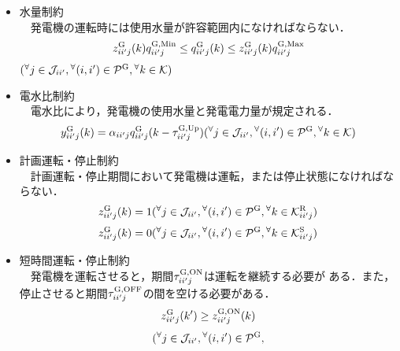 \begin{itemize}
\begin{equation}
		\end{equation}			
%	
	\item 水量制約 \\
	　発電機の運転時には使用水量が許容範囲内になければならない．
%
		\begin{equation}
			z^{\rm G}_{ii'j} (k) q_{ii'j}^{\mathrm{G,Min}} \leq q^{\rm G}_{ii'j} (k) \leq %
			z^{\rm G}_{ii'j} (k) q_{ii'j}^{\mathrm{G,Max}} 
		\end{equation}
%	
		\hspace{7.5cm}
		$ ( {}^{\forall} j \in \mathcal{J}_{ii'} , {}^\forall(i,i') \in \mathcal{P}^{\rm G} , %
		{}^{\forall} k \in \mathcal{K}) $
%
	\item 電水比制約 \\
	　電水比により，発電機の使用水量と発電電力量が規定される．
%
		\begin{equation}
			y^{\rm G}_{ii'j}(k) = \alpha_{ii'j} q^{\rm G}_{ii'j}(k - \tau^{\rm G,Up}_{ii'j})%
			\hfill ( {}^{\forall} j \in \mathcal{J}_{ii'} , {}^\forall(i,i') \in \mathcal{P}^{\rm G} , %
			{}^{\forall} k \in \mathcal{K}) 
		\end{equation}	
%		
	\item 計画運転・停止制約 \\
	　計画運転・停止期間において発電機は運転，または停止状態になければならない．
%
		\begin{equation}
			z^{\rm G}_{ii'j} (k) = 1
			\hfill ( {}^{\forall} j \in \mathcal{J}_{ii'} , {}^\forall(i,i') \in \mathcal{P}^{\rm G} , %
			{}^{\forall} k \in \mathcal{K}^{\rm R}_{ii'j})
		\end{equation}	
%		
		\begin{equation}
			z^{\rm G}_{ii'j} (k) = 0
			\hfill ( {}^{\forall} j \in \mathcal{J}_{ii'} , {}^\forall(i,i') \in \mathcal{P}^{\rm G} , %
			{}^{\forall} k \in \mathcal{K}^{\rm S}_{ii'j})
		\end{equation}	
%		
	\item
		短時間運転・停止制約 \\
		　発電機を運転させると，期間$\tau^{\rm G,ON}_{ii'j}$は運転を継続する必要が%
		ある．また，停止させると期間$\tau^{\rm G,OFF}_{ii'j}$の間を空ける必要がある．	
%
		\begin{equation}
			z^{\rm G}_{ii'j} ( k' ) \geq z_{ii'j}^{\mathrm {G,ON}} (k)
		\end{equation}	
%
		\begin{equation}
		\begin{split}
			( {}^{\forall} j \in \mathcal{J}_{ii'} , {}^\forall(i,i') \in \mathcal{P}^{\rm G} , %

\end{split}
\end{equation}
\end{itemize}
